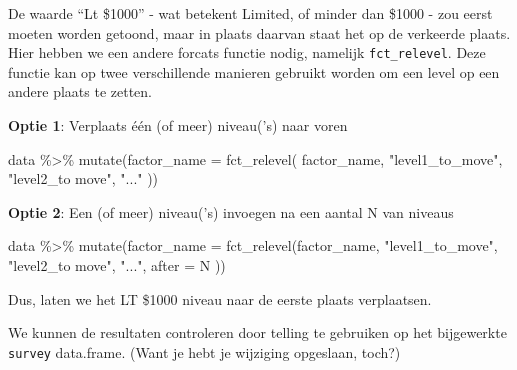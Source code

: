 \documentclass[]{tufte-book}
\newenvironment{Shaded}{}{}
\newcommand{\AttributeTok}[1]{\textcolor[rgb]{0.49,0.56,0.16}{#1}}
\newcommand{\FunctionTok}[1]{\textcolor[rgb]{0.02,0.16,0.49}{#1}}
\newcommand{\NormalTok}[1]{#1}
\newcommand{\OtherTok}[1]{\textcolor[rgb]{0.00,0.44,0.13}{#1}}
\newcommand{\SpecialCharTok}[1]{\textcolor[rgb]{0.25,0.44,0.63}{#1}}
\newcommand{\StringTok}[1]{\textcolor[rgb]{0.25,0.44,0.63}{#1}}
\begin{document}
De waarde ``Lt \$1000'' - wat betekent Limited, of minder dan \$1000 - zou eerst moeten worden getoond, maar in plaats daarvan staat het op de verkeerde plaats. Hier hebben we een andere forcats functie nodig, namelijk \texttt{fct\_relevel}. Deze functie kan op twee verschillende manieren gebruikt worden om een level op een andere plaats te zetten.

\textbf{Optie 1}: Verplaats één (of meer) niveau('s) naar voren

\begin{Shaded}
\begin{Highlighting}[]
\NormalTok{data }\SpecialCharTok{\%\textgreater{}\%}
  \FunctionTok{mutate}\NormalTok{(}\AttributeTok{factor\_name =} \FunctionTok{fct\_relevel}\NormalTok{(}
\NormalTok{    factor\_name,}
    \StringTok{"level1\_to\_move"}\NormalTok{, }\StringTok{"level2\_to move"}\NormalTok{, }\StringTok{"..."}
\NormalTok{  ))}
\end{Highlighting}
\end{Shaded}

\textbf{Optie 2}: Een (of meer) niveau('s) invoegen na een aantal N van niveaus

\begin{Shaded}
\begin{Highlighting}[]
\NormalTok{data }\SpecialCharTok{\%\textgreater{}\%}
  \FunctionTok{mutate}\NormalTok{(}\AttributeTok{factor\_name =} \FunctionTok{fct\_relevel}\NormalTok{(factor\_name,}
    \StringTok{"level1\_to\_move"}\NormalTok{, }\StringTok{"level2\_to move"}\NormalTok{, }\StringTok{"..."}\NormalTok{,}
    \AttributeTok{after =}\NormalTok{ N}
\NormalTok{  ))}
\end{Highlighting}
\end{Shaded}

Dus, laten we het LT \$1000 niveau naar de eerste plaats verplaatsen.

\begin{Shaded}
\end{Shaded}

We kunnen de resultaten controleren door telling te gebruiken op het bijgewerkte \texttt{survey} data.frame. (Want je hebt je wijziging opgeslaan, toch?)
\end{document}
